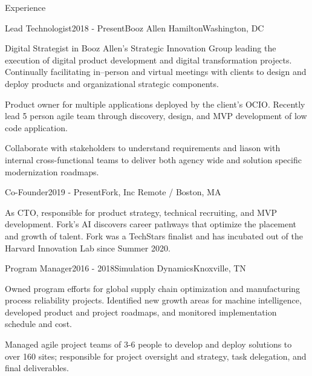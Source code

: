 \documentclass{resume} %
\begin{document}

\begin{rSection}{Experience}

\begin{rSubsection}{Lead Technologist}{2018 - Present}{Booz Allen Hamilton}{Washington, DC}
\item Digital Strategist in Booz Allen's Strategic Innovation Group leading the execution of digital product development and digital transformation projects.  Continually facilitating  in–person  and  virtual  meetings  with  clients  to  design  and  deploy products and  organizational  strategic components.
\item Product owner for multiple applications deployed by the client's OCIO.  Recently lead 5 person agile team through discovery, design, and MVP development of low code application.
\item Collaborate with stakeholders to understand requirements and liason with internal cross-functional teams to deliver both agency wide and solution specific modernization roadmaps.

\end{rSubsection}


\begin{rSubsection}{Co-Founder}{2019 - Present}{Fork, Inc}{ Remote / Boston, MA}
\item As CTO, responsible for product strategy, technical recruiting, and MVP development. Fork's AI discovers career pathways that optimize the placement and growth of talent. Fork was a TechStars finalist and has incubated out of the Harvard Innovation Lab since Summer 2020.

\end{rSubsection}


\begin{rSubsection}{Program Manager}{2016 - 2018}{Simulation Dynamics}{Knoxville, TN}
\item Owned program efforts for global supply chain optimization and manufacturing process reliability projects. Identified new growth areas for machine intelligence, developed product and project roadmaps, and monitored implementation schedule and cost.  
\item Managed agile project teams of 3-6 people to develop and deploy solutions to over 160 sites; responsible for project oversight and strategy, task delegation, and final deliverables.


\end{rSubsection}
\end{rSection}
\end{document}
